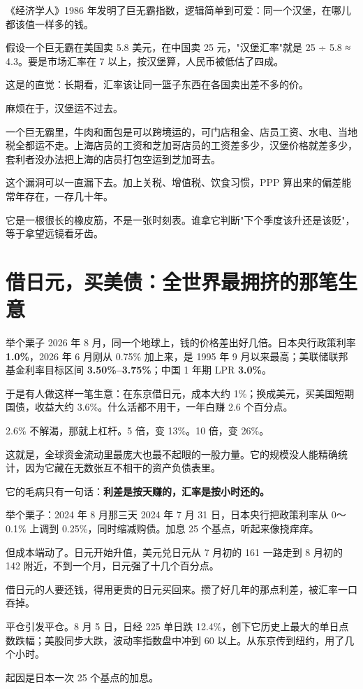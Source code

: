《经济学人》1986 年发明了巨无霸指数，逻辑简单到可爱：同一个汉堡，在哪儿都该值一样多的钱。

假设一个巨无霸在美国卖 5.8 美元，在中国卖 25 元，"汉堡汇率"就是 25 ÷ 5.8 ≈ 4.3。要是市场汇率在 7 以上，按汉堡算，人民币被低估了四成。

这是的直觉：长期看，汇率该让同一篮子东西在各国卖出差不多的价。

麻烦在于，汉堡运不过去。

一个巨无霸里，牛肉和面包是可以跨境运的，可门店租金、店员工资、水电、当地税全都运不走。上海店员的工资和芝加哥店员的工资差多少，汉堡价格就差多少，套利者没办法把上海的店员打包空运到芝加哥去。

这个漏洞可以一直漏下去。加上关税、增值税、饮食习惯，PPP 算出来的偏差能常年存在，一存几十年。

它是一根很长的橡皮筋，不是一张时刻表。谁拿它判断"下个季度该升还是该贬"，等于拿望远镜看牙齿。

\section{借日元，买美债：全世界最拥挤的那笔生意}

\begin{egbox}{举个栗子}
2026 年 8 月，同一个地球上，钱的价格差出好几倍。日本央行政策利率 \textbf{1.0\%}，2026 年 6 月刚从 0.75\% 加上来，是 1995 年 9 月以来最高；美联储联邦基金利率目标区间 \textbf{3.50\%–3.75\%}；中国 1 年期 LPR \textbf{3.0\%}。

于是有人做这样一笔生意：在东京借日元，成本大约 1\%；换成美元，买美国短期国债，收益大约 3.6\%。什么活都不用干，一年白赚 2.6 个百分点。

2.6\% 不解渴，那就上杠杆。5 倍，变 13\%。10 倍，变 26\%。

\end{egbox}

这就是，全球资金流动里最庞大也最不起眼的一股力量。它的规模没人能精确统计，因为它藏在无数张互不相干的资产负债表里。

它的毛病只有一句话：\textbf{利差是按天赚的，汇率是按小时还的。}

\begin{egbox}{举个栗子：2024 年 8 月那三天}
2024 年 7 月 31 日，日本央行把政策利率从 0～0.1\% 上调到 0.25\%，同时缩减购债。加息 25 个基点，听起来像挠痒痒。

但成本端动了。日元开始升值，美元兑日元从 7 月初的 161 一路走到 8 月初的 142 附近，不到一个月，日元强了十几个百分点。

借日元的人要还钱，得用更贵的日元买回来。攒了好几年的那点利差，被汇率一口吞掉。

平仓引发平仓。8 月 5 日，日经 225 单日跌 12.4\%，创下它历史上最大的单日点数跌幅；美股同步大跌，波动率指数盘中冲到 60 以上。从东京传到纽约，用了几个小时。

起因是日本一次 25 个基点的加息。

\end{egbox}

